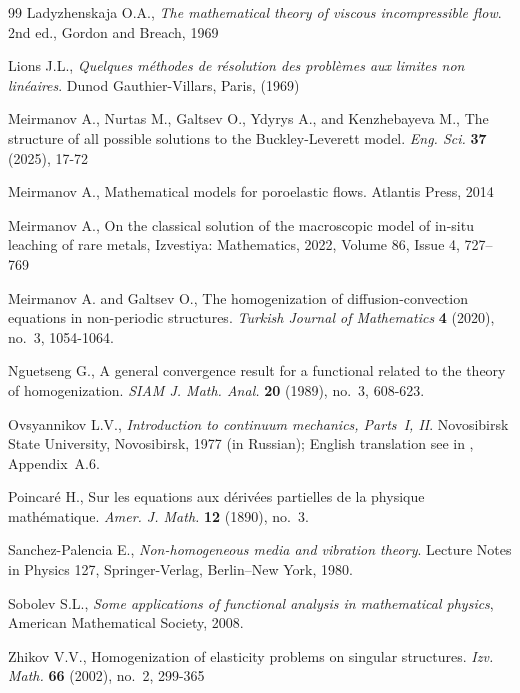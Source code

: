 \documentclass{article}
\theoremstyle{plain}
\theoremstyle{definition}
\numberwithin{equation}{section}
\begin{document}
\begin{thebibliography}{99}
Ladyzhenskaja O.A., \emph{The mathematical theory of viscous incompressible flow}.
2nd ed., Gordon and Breach, 1969

Lions J.L., \emph{Quelques m\'ethodes de r\'esolution des probl\`emes aux limites non lin\'eaires}.
Dunod Gauthier-Villars, Paris, (1969)

Meirmanov A., Nurtas M., Galtsev O., Ydyrys A., and Kenzhebayeva M.,
The structure of all possible solutions to the Buckley-Leverett model.
\emph{Eng. Sci.} \textbf{37} (2025), 17-72 

Meirmanov A., Mathematical models for poroelastic flows. Atlantis Press, 2014

Meirmanov A., On the classical solution of the macroscopic model of in-situ leaching of rare metals,
Izvestiya: Mathematics, 2022, Volume 86, Issue 4, 727–769

Meirmanov A. and Galtsev O., The homogenization of diffusion-convection equations in non-periodic structures. \emph{Turkish Journal of Mathematics} \textbf{4} (2020), no.~3, 1054-1064.

Nguetseng G.,
A general convergence result for a functional related to the theory of homogenization.
\emph{SIAM J. Math. Anal.} \textbf{20} (1989), no.~3, 608-623.

Ovsyannikov L.V.,
\emph{Introduction to continuum mechanics, Parts~I, II}.
Novosibirsk State University, Novosibirsk, 1977 (in Russian);
English translation see in \cite{14}, Appendix~A.6.

Poincar\'e H.,
Sur les equations aux d\'eriv\'ees partielles de la physique math\'ematique.
\emph{Amer. J. Math.} \textbf{12} (1890), no.~3.

Sanchez-Palencia E.,
\emph{Non-homogeneous media and vibration theory}.
Lecture Notes in Physics 127, Springer-Verlag, Berlin--New York, 1980.

Sobolev S.L.,
\emph{Some applications of functional analysis in mathematical physics},
American Mathematical Society, 2008.

Zhikov V.V.,
Homogenization of elasticity problems on singular structures.
\emph{Izv. Math.} \textbf{66} (2002), no.~2, 299-365

\end{thebibliography}
\end{document}
